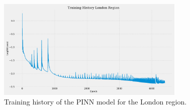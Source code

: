 \documentclass[12pt, letterpaper]{report}
\begin{document}
\begin{figure}[ht]
    \centering
    \includegraphics[width=0.8\textwidth]{images/pinn/Training_History_London Region.pdf}
    \caption{Training history of the PINN model for the London region.}
    \label{fig:Training_History_London}
\end{figure}




\end{document}
